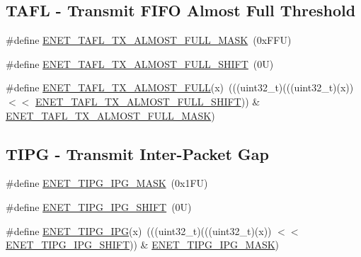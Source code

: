 \subsection*{T\+A\+FL -\/ Transmit F\+I\+FO Almost Full Threshold}
\begin{DoxyCompactItemize}
\item 
\#define \mbox{\hyperlink{group___e_n_e_t___register___masks_gae28ae12fc0e108d7d8d82efce1d3d016}{E\+N\+E\+T\+\_\+\+T\+A\+F\+L\+\_\+\+T\+X\+\_\+\+A\+L\+M\+O\+S\+T\+\_\+\+F\+U\+L\+L\+\_\+\+M\+A\+SK}}~(0x\+F\+F\+U)
\item 
\#define \mbox{\hyperlink{group___e_n_e_t___register___masks_ga8667ed29a0d85d764598142ed22744c9}{E\+N\+E\+T\+\_\+\+T\+A\+F\+L\+\_\+\+T\+X\+\_\+\+A\+L\+M\+O\+S\+T\+\_\+\+F\+U\+L\+L\+\_\+\+S\+H\+I\+FT}}~(0\+U)
\item 
\#define \mbox{\hyperlink{group___e_n_e_t___register___masks_gae7c579eb1b431bcaa54c840755d9dea0}{E\+N\+E\+T\+\_\+\+T\+A\+F\+L\+\_\+\+T\+X\+\_\+\+A\+L\+M\+O\+S\+T\+\_\+\+F\+U\+LL}}(x)~(((uint32\+\_\+t)(((uint32\+\_\+t)(x)) $<$$<$ \mbox{\hyperlink{group___e_n_e_t___register___masks_ga8667ed29a0d85d764598142ed22744c9}{E\+N\+E\+T\+\_\+\+T\+A\+F\+L\+\_\+\+T\+X\+\_\+\+A\+L\+M\+O\+S\+T\+\_\+\+F\+U\+L\+L\+\_\+\+S\+H\+I\+FT}})) \& \mbox{\hyperlink{group___e_n_e_t___register___masks_gae28ae12fc0e108d7d8d82efce1d3d016}{E\+N\+E\+T\+\_\+\+T\+A\+F\+L\+\_\+\+T\+X\+\_\+\+A\+L\+M\+O\+S\+T\+\_\+\+F\+U\+L\+L\+\_\+\+M\+A\+SK}})
\end{DoxyCompactItemize}
\subsection*{T\+I\+PG -\/ Transmit Inter-\/\+Packet Gap}
\begin{DoxyCompactItemize}
\item 
\#define \mbox{\hyperlink{group___e_n_e_t___register___masks_ga762834c2d579052c47b81ddf501514e1}{E\+N\+E\+T\+\_\+\+T\+I\+P\+G\+\_\+\+I\+P\+G\+\_\+\+M\+A\+SK}}~(0x1\+F\+U)
\item 
\#define \mbox{\hyperlink{group___e_n_e_t___register___masks_gabab61fb9b318b0019d086418cc90f1f7}{E\+N\+E\+T\+\_\+\+T\+I\+P\+G\+\_\+\+I\+P\+G\+\_\+\+S\+H\+I\+FT}}~(0\+U)
\item 
\#define \mbox{\hyperlink{group___e_n_e_t___register___masks_ga7414200ac00eb81e47fa4f8edf6dbc68}{E\+N\+E\+T\+\_\+\+T\+I\+P\+G\+\_\+\+I\+PG}}(x)~(((uint32\+\_\+t)(((uint32\+\_\+t)(x)) $<$$<$ \mbox{\hyperlink{group___e_n_e_t___register___masks_gabab61fb9b318b0019d086418cc90f1f7}{E\+N\+E\+T\+\_\+\+T\+I\+P\+G\+\_\+\+I\+P\+G\+\_\+\+S\+H\+I\+FT}})) \& \mbox{\hyperlink{group___e_n_e_t___register___masks_ga762834c2d579052c47b81ddf501514e1}{E\+N\+E\+T\+\_\+\+T\+I\+P\+G\+\_\+\+I\+P\+G\+\_\+\+M\+A\+SK}})
\end{DoxyCompactItemize}
